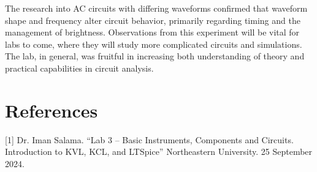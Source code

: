 \documentclass{article}
\begin{document}
The research into AC circuits with differing waveforms confirmed that waveform shape and frequency alter circuit 
behavior, primarily regarding timing and the management of brightness. Observations from this experiment will be 
vital for labs to come, where they will study more complicated circuits and simulations. The lab, in general, was 
fruitful in increasing both understanding of theory and practical capabilities in circuit analysis.


\section{References}
 [1] Dr. Iman Salama. “Lab 3 – Basic Instruments, Components and Circuits.
 Introduction to KVL, KCL, and LTSpice” Northeastern University. 25 September 2024.
\end{document}
